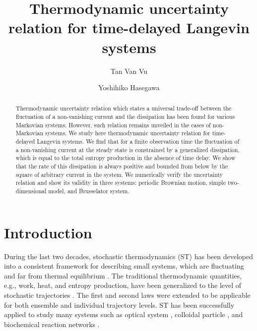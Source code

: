 \documentclass[pre,
twocolumn,
]{revtex4-1}
\theoremstyle{definition}
\theoremstyle{definition}
\begin{document}
\title{Thermodynamic uncertainty relation for time-delayed Langevin systems}
\author{Tan Van Vu}
\author{Yoshihiko Hasegawa}


\begin{abstract}
Thermodynamic uncertainty relation which states a universal trade-off between the fluctuation of a non-vanishing current and the dissipation has been found for various Markovian systems.
However, such relation remains unveiled in the cases of non-Markovian systems.
We study here thermodynamic uncertainty relation for time-delayed Langevin systems.
We find that for a finite observation time the fluctuation of a non-vanishing current at the steady state is constrained by a generalized dissipation, which is equal to the total entropy production in the absence of time delay.
We show that the rate of this dissipation is always positive and bounded from below by the square of arbitrary current in the system.
We numerically verify the uncertainty relation and show its validity in three systems: periodic Brownian motion, simple two-dimensional model, and Brusselator system.
\end{abstract}

\pacs{}
\maketitle

\section{Introduction}\label{sect.1}
During the last two decades, stochastic thermodynamics (ST) has been developed into a consistent framework for describing small systems, which are fluctuating and far from thermal equilibrium \cite{Sekimoto.1998.PTPS,Denis.2002.AP,Seifert.2005.PRL,Seifert.2012.RPP,Yannick.2015.PA,Jaco.2016.EPL,Gong.2016.PRL,Goldt.2017.PRL}.
The traditional thermodynamic quantities, e.g., work, heat, and entropy production, have been generalized to the level of stochastic trajectories \cite{Sekimoto.1998.PTPS,Seifert.2005.PRL}.
The first and second laws were extended to be applicable for both ensemble and individual trajectory levels.
ST has been successfully applied to study many systems such as optical system \cite{Tietz.2006.PRL}, colloidal particle \cite{Blickle.2006.PRL}, and biochemical reaction networks \cite{Schmiedl.2007.JCP,Schmiedl.2007.JSP}.
\end{document}
